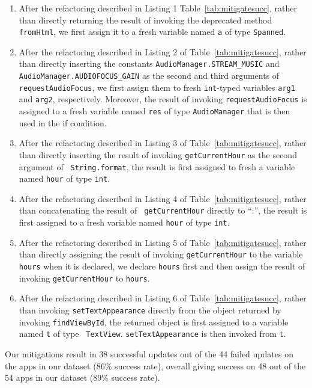 \begin{enumerate}
\item After the refactoring described in Listing 1
Table~\ref{tab:mitigatesucc}, rather than directly returning the result of
invoking the deprecated method {\tt fromHtml}, we first assign it to a fresh
variable named {\tt a} of type {\tt Spanned}.

\item After the refactoring described in Listing 2 of
Table~\ref{tab:mitigatesucc}, rather than directly inserting the constants
{\tt AudioManager.STREAM\_MUSIC} and {\tt AudioManager.AUDIOFOCUS\_GAIN} as
the second and third arguments of {\tt requestAudioFocus}, we first assign
them to fresh {\tt int}-typed variables {\tt arg1} and {\tt arg2},
respectively. Moreover, the result of invoking {\tt requestAudioFocus} is
assigned to a fresh variable named {\tt res} of type {\tt AudioManager}
that is then used in the if condition.

\item After the refactoring described in Listing 3 of
Table~\ref{tab:mitigatesucc}, rather than directly inserting the result of
invoking {\tt getCurrentHour} as the second argument of {\tt
String.format}, the result is first assigned to fresh a variable named {\tt hour}
of type {\tt int}.

\item After the refactoring described in Listing 4 of
Table~\ref{tab:mitigatesucc}, rather than concatenating the result of {\tt
getCurrentHour} directly to ``:'', the result is first assigned to a fresh
variable named {\tt hour} of type {\tt int}.

\item After the refactoring described in Listing 5 of
Table~\ref{tab:mitigatesucc}, rather than directly assigning the result of
invoking {\tt getCurrentHour} to the variable {\tt hours} when it is
declared, we declare {\tt hours} first and then assign the result of
invoking {\tt getCurrentHour} to {\tt hours}.

\item After the refactoring described in Listing 6 of
Table~\ref{tab:mitigatesucc}, rather than invoking {\tt setTextAppearance}
directly from the object returned by invoking {\tt findViewById}, the
returned object is first assigned to a variable named {\tt t} of type {\tt
TextView}. {\tt setTextAppearance} is then invoked from {\tt t}.

\end{enumerate}

Our mitigations result in 38 successful updates out of the 44 failed
updates on the apps in our dataset (86\% success rate), overall giving
success on 48 out of the 54 apps in our dataset (89\% success rate).
